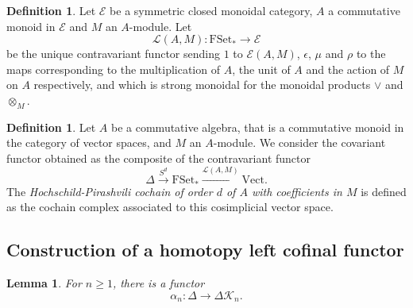 \documentclass[]{amsart}
\newtheorem{lemma}[theorem]{Lemma}
\theoremstyle{definition}
\newtheorem{definition}[theorem]{Definition}
\begin{document}
\begin{definition}\cite[Section 2.9]{BataninBergerLattice}
	Let $\mathcal{E}$ be a symmetric closed monoidal category, $A$ a commutative monoid in $\mathcal{E}$ and $M$ an $A$-module. Let
	\[
		\mathcal{L}(A,M):\mathrm{FSet}_* \to \mathcal{E}
	\]
	be the unique contravariant functor sending $1$ to $\mathcal{E}(A,M)$, $\epsilon$, $\mu$ and $\rho$ to the maps corresponding to the multiplication of $A$, the unit of $A$ and the action of $M$ on $A$ respectively, and which is strong monoidal for the monoidal products $\vee$ and $\otimes_M$.
\end{definition}




\begin{definition}\cite[Section 1.7]{pirashvili}\label{definitionhochschildpirashvili}
	Let $A$ be a commutative algebra, that is a commutative monoid in the category of vector spaces, and $M$ an $A$-module. We consider the covariant functor obtained as the composite of the contravariant functor
	\[
		\Delta \xrightarrow{S^d} \mathrm{FSet}_* \xrightarrow{\mathcal{L}(A,M)} \mathrm{Vect}.
	\]
	The \emph{Hochschild-Pirashvili cochain of order $d$ of $A$ with coefficients in $M$} is defined as the cochain complex associated to this cosimplicial vector space.
\end{definition}

\subsection{Construction of a homotopy left cofinal functor}



\begin{lemma}\label{lemmacofinalfunctor}
	For $n \geq 1$, there is a functor
	\[
	\alpha_n: \Delta \to \Delta\mathcal{K}_n.
	\]
\end{lemma}
\end{document}
